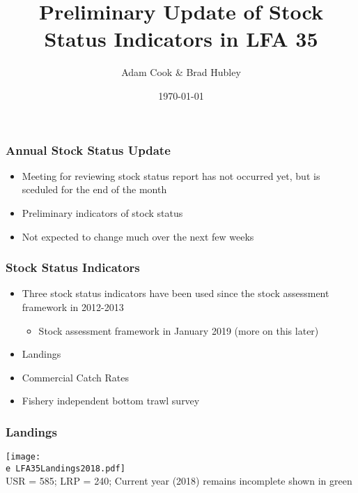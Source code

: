 \documentclass{beamer}
\title[LFA 35 American Lobster]{Preliminary Update of Stock Status Indicators in LFA 35\\ }
\author{Adam Cook \& Brad Hubley} %
\institute[Population Ecology Division]
{Bedford Institute of Oceanography \\ %
\medskip
\textit{Adam.Cook@dfo-mpo.gc.ca} %
}
\date{\today} %
\newcommand{\e}{/SpinDr/backup/bio_data/bio.lobster/figures/}
\begin{document}
\begin{frame}
	\titlepage %

\end{frame}


%
\begin{frame}
\frametitle{Annual Stock Status Update}
%
\begin{itemize}
	\item Meeting for reviewing stock status report has not occurred yet, but is sceduled for the end of the month
	\item Preliminary indicators of stock status 
	\item Not expected to change much over the next few weeks
\end{itemize}

\end{frame}

\begin{frame}

	\frametitle{Stock Status Indicators}

	\begin{itemize}
		\item Three stock status indicators have been used since the stock assessment framework in 2012-2013
		\begin{itemize}
			\item Stock assessment framework in January 2019 (more on this later)
		\end{itemize}
		\item Landings
		\item Commercial Catch Rates
		\item Fishery independent bottom trawl survey
	\end{itemize}


\end{frame}


\begin{frame}
\frametitle{Landings}
%
	\centering
	  \texttt{[image: \\e LFA35Landings2018.pdf]}\\[-1ex]
	{\tiny{USR = 585; LRP = 240; Current year (2018) remains incomplete shown in green}}


\end{frame}
\end{document}
